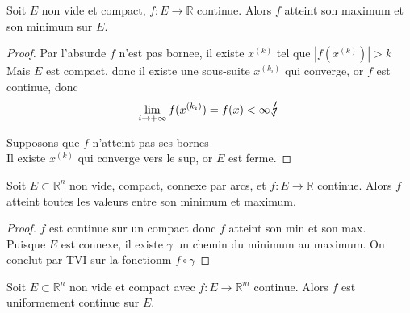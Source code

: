 \documentclass[../main.tex]{subfiles}
\begin{document}
\begin{thm}
Soit $E$ non vide et compact, $f: E \to \mathbb{R}$ continue. Alors $f$ atteint son maximum et son minimum sur $E$. 
\end{thm}
\begin{proof}
	Par l'absurde $f$ n'est pas bornee, il existe $x^{( k) }$ tel que $|f( x^{( k) })| >k$ \\
	Mais $E$ est compact, donc il existe une sous-suite $x^{( k_i) }$ qui converge, or $f$ est continue, donc
	\[ 
		\lim_{i \to  + \infty} f( x^{( k_i) }) = f( x) < \infty \contra
	\]
	
Supposons que $f$ n'atteint pas ses bornes\\
Il existe $x^{( k) }$ qui converge vers le sup, or $E$ est ferme.
\end{proof}
\begin{thm}
Soit $E \subset \mathbb{R}^n$ non vide, compact, connexe par arcs, et $f: E \to \mathbb{R}$ continue. Alors $f$ atteint toutes les valeurs entre son minimum et maximum.
\end{thm}
\begin{proof}
$f$ est continue sur un compact donc $f$ atteint son min et son max.\\
Puisque $E$ est connexe, il existe  $\gamma$ un chemin du minimum au maximum.  On conclut par TVI sur la fonctionm $f \circ \gamma$
\end{proof}
\begin{thm}
Soit $E  \subset \mathbb{R}^n$ non vide et compact avec $f: E \to \mathbb{R}^m$ continue. Alors $f$ est uniformement continue sur $E$.
\end{thm}
\end{document}
